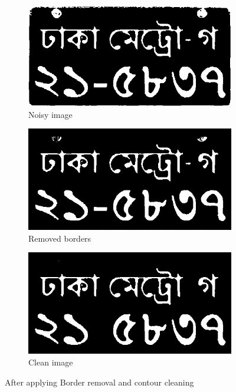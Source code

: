 \documentclass{standalone}
\begin{document}
\begin{figure}
\begin{subfigure}{.5\textwidth}
  \centering
  \includegraphics[width=.8\linewidth]{./img/sample/stage11.jpg}
  \caption{Noisy image}
\end{subfigure}
\begin{subfigure}{.5\textwidth}
  \centering
  \includegraphics[width=.8\linewidth]{./img/sample/stage12.jpg}
  \caption{Removed borders}
\end{subfigure}
\begin{subfigure}{0.9\textwidth}
  \centering
  \includegraphics[width=.8\linewidth]{./img/sample/stage13.jpg}
  \caption{Clean image}
\end{subfigure}
\caption{After applying Border removal and contour cleaning}
\label{fig:CleaningStage}
\end{figure}
\end{document}
